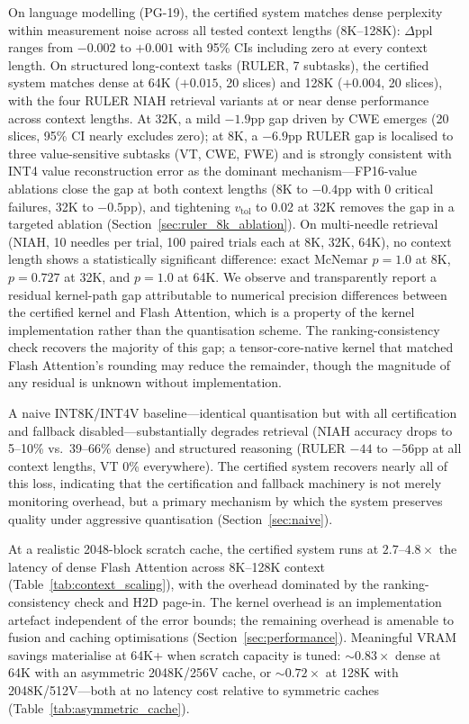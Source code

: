 \documentclass[10pt,twocolumn,a4paper]{article}
\theoremstyle{definition}
\theoremstyle{remark}
\begin{document}
On language modelling (PG-19), the certified system matches dense perplexity within measurement noise across all tested context lengths (8K--128K): $\Delta\mathrm{ppl}$ ranges from $-0.002$ to $+0.001$ with 95\% CIs including zero at every context length.  On structured long-context tasks (RULER, 7 subtasks), the certified system matches dense at 64K ($+0.015$, 20 slices) and 128K ($+0.004$, 20 slices), with the four RULER NIAH retrieval variants at or near dense performance across context lengths.  At 32K, a mild $-1.9$pp gap driven by CWE emerges (20 slices, 95\% CI nearly excludes zero); at 8K, a $-6.9$pp RULER gap is localised to three value-sensitive subtasks (VT, CWE, FWE) and is strongly consistent with INT4 value reconstruction error as the dominant mechanism---FP16-value ablations close the gap at both context lengths (8K to $-0.4$pp with 0 critical failures, 32K to $-0.5$pp), and tightening $v_{\mathrm{tol}}$ to 0.02 at 32K removes the gap in a targeted ablation (Section~\ref{sec:ruler_8k_ablation}).  On multi-needle retrieval (NIAH, 10 needles per trial, 100 paired trials each at 8K, 32K, 64K), no context length shows a statistically significant difference: exact McNemar $p{=}1.0$ at 8K, $p{=}0.727$ at 32K, and $p{=}1.0$ at 64K.  We observe and transparently report a residual kernel-path gap attributable to numerical precision differences between the certified kernel and Flash Attention, which is a property of the kernel implementation rather than the quantisation scheme.  The ranking-consistency check recovers the majority of this gap; a tensor-core-native kernel that matched Flash Attention's rounding may reduce the remainder, though the magnitude of any residual is unknown without implementation.

A naive INT8K/INT4V baseline---identical quantisation but with all certification and fallback disabled---substantially degrades retrieval (NIAH accuracy drops to 5--10\% vs.\ 39--66\% dense) and structured reasoning (RULER $-44$ to $-56$pp at all context lengths, VT 0\% everywhere).  The certified system recovers nearly all of this loss, indicating that the certification and fallback machinery is not merely monitoring overhead, but a primary mechanism by which the system preserves quality under aggressive quantisation (Section~\ref{sec:naive}).

At a realistic 2048-block scratch cache, the certified system runs at $2.7\text{--}4.8\times$ the latency of dense Flash Attention across 8K--128K context (Table~\ref{tab:context_scaling}), with the overhead dominated by the ranking-consistency check and H2D page-in.  The kernel overhead is an implementation artefact independent of the error bounds; the remaining overhead is amenable to fusion and caching optimisations (Section~\ref{sec:performance}).  Meaningful VRAM savings materialise at 64K+ when scratch capacity is tuned: ${\sim}0.83\times$ dense at 64K with an asymmetric 2048K/256V cache, or ${\sim}0.72\times$ at 128K with 2048K/512V---both at no latency cost relative to symmetric caches (Table~\ref{tab:asymmetric_cache}).
\end{document}
